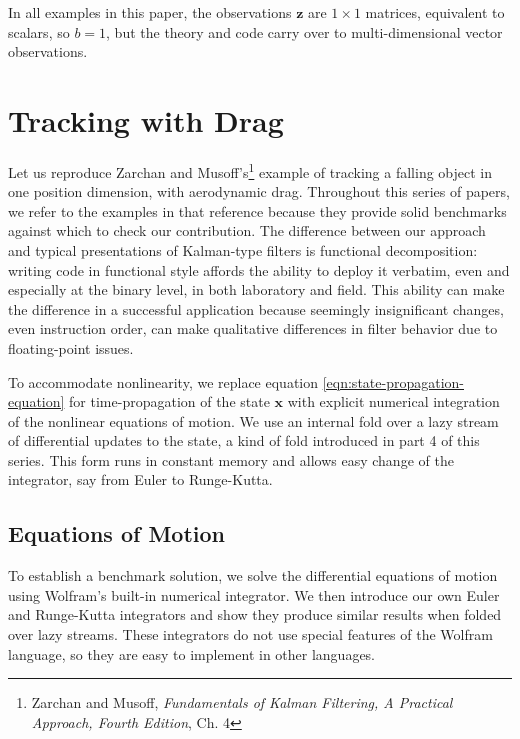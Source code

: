 \documentclass[10pt,oneside,x11names]{article}
\begin{document}
\noindent In all examples in this paper, the observations \(\mathbold{z}\) are
\(1\times{1}\) matrices, equivalent to scalars, so \(b=1\), but the theory and code
carry over to multi-dimensional vector observations.

\section{Tracking with Drag}
\label{sec:orgheadline9}

Let us reproduce Zarchan and Musoff's\footnote{Zarchan and Musoff, \emph{Fundamentals of Kalman Filtering, A Practical
Approach, Fourth Edition}, Ch. 4} example of tracking a falling
object in one position dimension, with aerodynamic drag. Throughout this series
of papers, we refer to the examples in that reference because they provide solid
benchmarks against which to check our contribution. The difference between our
approach and typical presentations of Kalman-type filters is functional
decomposition: writing code in functional style affords the ability to deploy it
verbatim, even and especially at the binary level, in both laboratory and field.
This ability can make the difference in
a successful application because seemingly insignificant changes, even
instruction order, can make qualitative differences in filter behavior due to
floating-point issues.

To accommodate nonlinearity, we replace equation
\ref{eqn:state-propagation-equation} for time-propagation of the state
\(\mathbold{x}\) with explicit numerical integration of the nonlinear equations of
motion. We use an internal fold over a lazy stream of differential updates to
the state, a kind of fold introduced in part 4 of this series.\footnotemark[3]{} This
form runs in constant memory and allows easy change of the integrator, say from
Euler to Runge-Kutta.

\subsection{Equations of Motion}
\label{sec:orgheadline4}

To establish a benchmark solution, we solve the differential equations of motion
using Wolfram's built-in numerical integrator. We then introduce our own Euler
and Runge-Kutta integrators and show they produce similar results when folded
over lazy streams. These integrators do not use special features of the Wolfram
language, so they are easy to implement in other languages.
\end{document}
